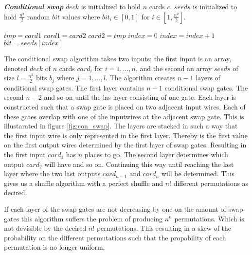 \documentclass[twoside,11pt,openright]{report}
\begin{document}
\begin{algorithm}
\caption{\textbf{\textit{Conditional swap}} \newline
    $deck$ is initialized to hold $n$ cards $c$. \newline
    $seeds$ is initialized to hold $\frac{n^2}{2}$ random $bit$ values where $bit_i\in[0,1]$ for $i\in [1,\frac{n^2}{2}]$.
}
\label{alg:con_swap}

\begin{algorithmic}[1]
\State $tmp = card1$
\State $card1 = card2$
\State $card2 = tmp$
\EndIf
\EndFunction
\State
{}
\State $index = 0$
\State $index = index + 1$
\State $bit = seeds[index]$
\State {}
\EndFor
\EndFor
\EndFunction
\end{algorithmic}
\end{algorithm}


The conditional swap algorithm takes two inputs; the first input is an array, denoted $deck$ of $n$ cards $card_i$ for $i=1,\dots,n$, and the second an array $seeds$ of size $l=\frac{n^2}{2}$ bits $b_j$ where $j=1,\dots, l$. The algorithm creates $n-1$ layers of conditional swap gates. The first layer contains $n-1$ conditional swap gates. The second $n-2$ and so on until the las layer consisting of one gate. Each layer is constructed such that a swap gate is placed on two adjacent input wires. Each of these gates overlap with one of the inputwires at the adjacent swap gate. This is illustarated in figure \ref{fig:con_swap}. The layers are stacked in such a way that the first input wire is only represented in the first layer. Thereby is the first value on the first output wires determined by the first layer of swap gates. Resulting in the first input $card_1$ has $n$ places to go. The second layer determines which output $card_2$ will have and so on. Continuing this way until reaching the last layer where the two last outputs $card_{n-1}$ and $card_n$ will be determined. This gives us a shuffle algorithm with a perfect shuffle and $n!$ different permutations as decired.

If each layer of the swap gates are not decreasing by one on the amount of swap gates this algorithm suffers the problem of producing $n^n$ permutations. Which is not devisible by the decired $n!$ permutations. This resulting in a skew of the probability on the different permutations such that the propability of each permutation is no longer uniform.
\end{document}

